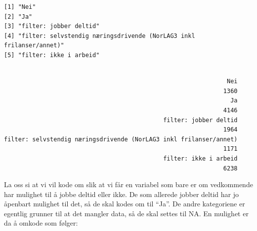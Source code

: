 \documentclass[
  letterpaper,
  DIV=11,
  numbers=noendperiod]{scrreprt}
\newenvironment{Shaded}{\begin{snugshade}}{\end{snugshade}}
\newcommand{\FunctionTok}[1]{\textcolor[rgb]{0.28,0.35,0.67}{#1}}
\newcommand{\NormalTok}[1]{\textcolor[rgb]{0.00,0.23,0.31}{#1}}
\newcommand{\SpecialCharTok}[1]{\textcolor[rgb]{0.37,0.37,0.37}{#1}}
\begin{document}
\begin{verbatim}
[1] "Nei"                                                               
[2] "Ja"                                                                
[3] "filter: jobber deltid"                                             
[4] "filter: selvstendig næringsdrivende (NorLAG3 inkl frilanser/annet)"
[5] "filter: ikke i arbeid"                                             
\end{verbatim}

\begin{Shaded}
\end{Shaded}

\begin{verbatim}

                                                               Nei 
                                                              1360 
                                                                Ja 
                                                              4146 
                                             filter: jobber deltid 
                                                              1964 
filter: selvstendig næringsdrivende (NorLAG3 inkl frilanser/annet) 
                                                              1171 
                                             filter: ikke i arbeid 
                                                              6238 
\end{verbatim}

La oss si at vi vil kode om slik at vi får en variabel som bare er om
vedkommende har mulighet til å jobbe deltid eller ikke. De som allerede
jobber deltid har jo åpenbart mulighet til det, så de skal kodes om til
``Ja''. De andre kategoriene er egentlig grunner til at det mangler
data, så de skal settes til NA. En mulighet er da å omkode som følger:
\end{document}
